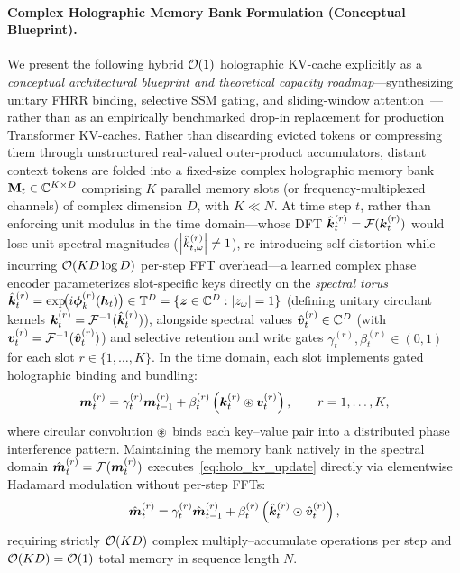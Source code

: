 \paragraph{Complex Holographic Memory Bank Formulation (Conceptual Blueprint).}
We present the following hybrid $\mathcal{O}\!\left(1\right)$ holographic KV-cache explicitly as a \emph{conceptual architectural blueprint and theoretical capacity roadmap}---synthesizing unitary FHRR binding, selective SSM gating, and sliding-window attention~\cite{HOLOGRAPHIC_ATTENTION_OR_KV_CACHE}---rather than as an empirically benchmarked drop-in replacement for production Transformer KV-caches.
Rather than discarding evicted tokens or compressing them through unstructured real-valued outer-product accumulators, distant context tokens are folded into a fixed-size complex holographic memory bank $\mathbf{M}_t \in \mathbb{C}^{K \times D}$ comprising $K$ parallel memory slots (or frequency-multiplexed channels) of complex dimension $D$, with $K \ll N$.
At time step $t$, rather than enforcing unit modulus in the time domain---whose DFT $\hat{\boldsymbol{k}}_t^{(r)} = \mathcal{F}(\boldsymbol{k}_t^{(r)})$ would lose unit spectral magnitudes ($\left\lvert \hat{k}_{t,\omega}^{(r)} \right\rvert \neq 1$), re-introducing self-distortion while incurring $\mathcal{O}\!\left(K D \log D\right)$ per-step FFT overhead---a learned complex phase encoder parameterizes slot-specific keys directly on the \emph{spectral torus} $\hat{\boldsymbol{k}}_t^{(r)} = \exp\!\bigl(i\boldsymbol{\phi}_k^{(r)}(\boldsymbol{h}_t)\bigr) \in \mathbb{T}^D = \{\boldsymbol{z} \in \mathbb{C}^D : \left\lvert z_\omega \right\rvert = 1\}$ (defining unitary circulant kernels $\boldsymbol{k}_t^{(r)} = \mathcal{F}^{-1}(\hat{\boldsymbol{k}}_t^{(r)})$), alongside spectral values $\hat{\boldsymbol{v}}_t^{(r)} \in \mathbb{C}^D$ (with $\boldsymbol{v}_t^{(r)} = \mathcal{F}^{-1}(\hat{\boldsymbol{v}}_t^{(r)})$) and selective retention and write gates $\gamma_t^{(r)}, \beta_t^{(r)} \in (0, 1)$ for each slot $r \in \{1, \dots, K\}$.
In the time domain, each slot implements gated holographic binding and bundling:
\begin{equation}\label{eq:holo_kv_update}
    \boldsymbol{m}_t^{(r)} = \gamma_t^{(r)} \boldsymbol{m}_{t-1}^{(r)} + \beta_t^{(r)} \left(\boldsymbol{k}_t^{(r)} \circledast \boldsymbol{v}_t^{(r)}\right), \qquad r = 1, \dots, K,
\end{equation}
where circular convolution $\circledast$ binds each key--value pair into a distributed phase interference pattern.
Maintaining the memory bank natively in the spectral domain $\hat{\boldsymbol{m}}_t^{(r)} = \mathcal{F}(\boldsymbol{m}_t^{(r)})$ executes~\eqref{eq:holo_kv_update} directly via elementwise Hadamard modulation without per-step FFTs:
\begin{equation}\label{eq:holo_kv_fft}
    \hat{\boldsymbol{m}}_t^{(r)} = \gamma_t^{(r)} \hat{\boldsymbol{m}}_{t-1}^{(r)} + \beta_t^{(r)} \left(\hat{\boldsymbol{k}}_t^{(r)} \odot \hat{\boldsymbol{v}}_t^{(r)}\right),
\end{equation}
requiring strictly $\mathcal{O}\!\left(K D\right)$ complex multiply--accumulate operations per step and $\mathcal{O}\!\left(K D\right) = \mathcal{O}\!\left(1\right)$ total memory in sequence length $N$.


